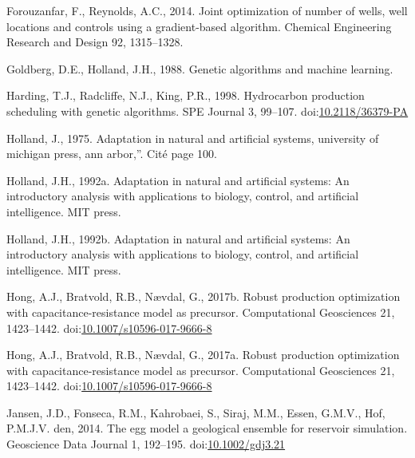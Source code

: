 \documentclass[]{elsarticle} %
\newlength{\cslhangindent}
\newenvironment{CSLReferences}[2] %
 {%
  \setlength{\parindent}{0pt}
  \ifodd #1 \everypar{\setlength{\hangindent}{\cslhangindent}}\ignorespaces\fi
  \ifnum #2 > 0
  \setlength{\parskip}{#2\baselineskip}
  \fi
 }%
 {}
\begin{document}
\begin{CSLReferences}{1}{0}
\leavevmode{}%
Forouzanfar, F., Reynolds, A.C., 2014. Joint optimization of number of wells, well locations and controls using a gradient-based algorithm. Chemical Engineering Research and Design 92, 1315--1328.

\leavevmode{}%
Goldberg, D.E., Holland, J.H., 1988. Genetic algorithms and machine learning.

\leavevmode{}%
Harding, T.J., Radcliffe, N.J., King, P.R., 1998. Hydrocarbon production scheduling with genetic algorithms. SPE Journal 3, 99--107. doi:\href{https://doi.org/10.2118/36379-PA}{10.2118/36379-PA}

\leavevmode{}%
Holland, J., 1975. Adaptation in natural and artificial systems, university of michigan press, ann arbor,{''}. Cité page 100.

\leavevmode{}%
Holland, J.H., 1992a. Adaptation in natural and artificial systems: An introductory analysis with applications to biology, control, and artificial intelligence. MIT press.

\leavevmode{}%
Holland, J.H., 1992b. Adaptation in natural and artificial systems: An introductory analysis with applications to biology, control, and artificial intelligence. MIT press.

\leavevmode{}%
Hong, A.J., Bratvold, R.B., Nævdal, G., 2017b. Robust production optimization with capacitance-resistance model as precursor. Computational Geosciences 21, 1423--1442. doi:\href{https://doi.org/10.1007/s10596-017-9666-8}{10.1007/s10596-017-9666-8}

\leavevmode{}%
Hong, A.J., Bratvold, R.B., Nævdal, G., 2017a. Robust production optimization with capacitance-resistance model as precursor. Computational Geosciences 21, 1423--1442. doi:\href{https://doi.org/10.1007/s10596-017-9666-8}{10.1007/s10596-017-9666-8}

\leavevmode{}%
Jansen, J.D., Fonseca, R.M., Kahrobaei, S., Siraj, M.M., Essen, G.M.V., Hof, P.M.J.V. den, 2014. The egg model {\textendash} a geological ensemble for reservoir simulation. Geoscience Data Journal 1, 192--195. doi:\href{https://doi.org/10.1002/gdj3.21}{10.1002/gdj3.21}


\end{CSLReferences}
\end{document}

